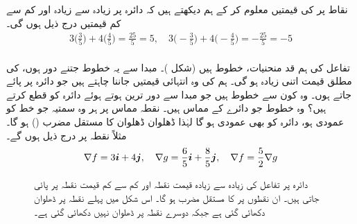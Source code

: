 نقاط    پر  کی قیمتیں معلوم کر کے ہم دیکھتے ہیں کہ دائرہ  پر  زیادہ سے زیادہ  اور کم سے کم قیمتیں درج ذیل ہوں گی۔
\begin{align*}
3\big(\frac{3}{5}\big)+4\big(\frac{4}{5}\big)=\frac{25}{5}=5,\quad  3\big(-\frac{3}{5}\big)+4\big(-\frac{4}{5}\big)=-\frac{25}{5}=-5
\end{align*}  
\\
تفاعل  کی ہم قد منحنیات،  خطوط  ہیں (شکل )۔ مبدا سے یہ خطوط جتنے دور ہوں،  کی مطلق قیمت اتنی زیادہ ہو گی۔ ہم  کی وہ انتہائی قیمتیں جاننا چاہتے ہیں جو دائرہ  پر پائے جاتے ہوں۔ وہ کون سے خطوط ہیں جو مبدا سے دور ترین ہوتے ہوئے دائرہ کو قطع کرتے ہیں؟ وہ خطوط جو دائرے کے مماس ہیں۔ نقطہ مماس پر ہر وہ سمتیہ  جو  خط  کو  عمودی ہو، دائرہ کو بھی عمودی ہو گا لہٰذا ڈھلوان   ڈھلوان  کا مستقل مضرب  ()  ہو گا۔
  مثلاً نقطہ  پر درج ذیل ہوں گے۔
\begin{align*}
\nabla f=3{\boldsymbol{i}}+4{\boldsymbol{j}},\quad \nabla g=\frac{6}{5}{\boldsymbol{i}}+\frac{8}{5}{\boldsymbol{j}},\quad \nabla f=\frac{5}{2}\nabla g
\end{align*} 
\begin{figure}
\centering
{}
\caption{
دائرہ  پر تفاعل  کی زیادہ سے زیادہ قیمت نقطہ    اور کم سے کم قیمت نقطہ  پر پائی جاتی ہیں۔ ان نقطوں پر   کا مستقل مضرب  ہو گا۔ اس شکل میں پہلے نقطہ پر ڈھلوان دکھائی گئی ہے جبکہ دوسرے نقطہ پر ڈھلوان نہیں دکھائی گئی ہے۔ 
}
\label{شکل_مثال_کثیرالمتغیر_دائرہ_پر_انتہائی_قیمتیں_درکار}
\end{figure}

